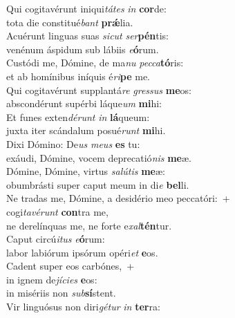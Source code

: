 \evenverse Qui cogitavérunt iniqui\textit{tá}\textit{tes} \textit{in} \textbf{cor}de:~\*\\
\evenverse tota die constitué\textit{bant} \textbf{prǽ}lia.\\
\oddverse Acuérunt linguas suas \textit{si}\textit{cut} \textit{ser}\textbf{pén}tis:~\*\\
\oddverse venénum áspidum sub lábiis \textit{e}\textbf{ó}rum.\\
\evenverse Custódi me, Dómine, de ma\textit{nu} \textit{pec}\textit{ca}\textbf{tó}ris:~\*\\
\evenverse et ab homínibus iníquis é\textit{ri}\textbf{pe} me.\\
\oddverse Qui cogitavérunt supplantá\textit{re} \textit{gres}\textit{sus} \textbf{me}os:~\*\\
\oddverse abscondérunt supérbi láque\textit{um} \textbf{mi}hi:\\
\evenverse Et funes exten\textit{dé}\textit{runt} \textit{in} \textbf{lá}queum:~\*\\
\evenverse juxta iter scándalum posué\textit{runt} \textbf{mi}hi.\\
\oddverse Dixi Dómino: De\textit{us} \textit{me}\textit{us} \textbf{es} tu:~\*\\
\oddverse exáudi, Dómine, vocem deprecatió\textit{nis} \textbf{me}æ.\\
\evenverse Dómine, Dómine, virtus \textit{sa}\textit{lú}\textit{tis} \textbf{me}æ:~\*\\
\evenverse obumbrásti super caput meum in di\textit{e} \textbf{bel}li.\\
\oddverse Ne tradas me, Dómine, a desidério meo peccatóri:~+\\
\oddverse  cogi\textit{ta}\textit{vé}\textit{runt} \textbf{con}tra me,~\*\\
\oddverse ne derelínquas me, ne forte e\textit{xal}\textbf{tén}tur.\\
\evenverse Caput circú\textit{i}\textit{tus} \textit{e}\textbf{ó}rum:~\*\\
\evenverse labor labiórum ipsórum opéri\textit{et} \textbf{e}os.\\
\oddverse Cadent super eos carbónes,~+\\
\oddverse  in ignem de\textit{jí}\textit{ci}\textit{es} \textbf{e}os:~\*\\
\oddverse in misériis non \textit{sub}\textbf{sí}stent.\\
\evenverse Vir linguósus non diri\textit{gé}\textit{tur} \textit{in} \textbf{ter}ra:~\*\\
